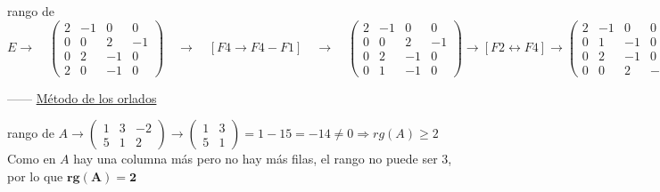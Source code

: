 \begin{proofw}
\noindent  * rango de $E \to \quad \left( \begin{matrix} 2&-1&0&0\\0&0&2&-1\\0&2&-1&0\\2&0&-1&0  \end{matrix} \right) \quad \to \quad   [F4 \to F4-F1] \quad \to \quad \left( \begin{matrix} 2&-1&0&0\\0&0&2&-1\\0&2&-1&0\\0&1&-1&0  \end{matrix} \right)  \to [F2 \leftrightarrow F4  ] \to \left( \begin{matrix} 2&-1&0&0\\0&1&-1&0\\0&2&-1&0\\0&0&2&-1  \end{matrix} \right) \to [F3 \to F3-2F2] \to \left( \begin{matrix} 2&-1&0&0\\0&1&-1&0\\0&0&1&0\\0&0&2&-1  \end{matrix} \right) \to [F4 \leftrightarrow F3 ] \to \left( \begin{matrix} 2&-1&0&0\\0&1&-1&0\\0&0&2&-1\\0&0&1&0  \end{matrix} \right) \to [F4 \to 2F4-F3] \to \left( \begin{matrix} 2&-1&0&0\\0&1&-1&0\\0&0&2&-1\\0&0&0&1  \end{matrix} \right) \to \Rightarrow \boldsymbol{rg(E)=4}$

\vspace{4mm}
------ \underline{Método de los orlados}

\noindent  * rango de $A \to   \left( \begin{matrix} \boxed{1}&\boxed{3}&-2\\\boxed{5}&\boxed{1}&2  \end{matrix} \right) \to \left( \begin{matrix} 1&3\\5&1  \end{matrix} \right)=1-15=-14\neq 0 \Rightarrow rg(A)\ge 2\;$ Como en $A$ hay una columna más pero no hay más filas, el rango no puede ser $3$, por lo que $\boldsymbol{ rg(A)=2}$



\end{proofw}

